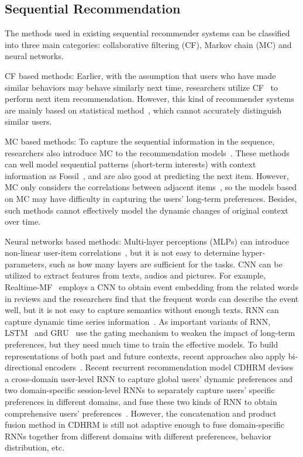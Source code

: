 \documentclass[preprint,12pt]{elsarticle}
\begin{document}
\begin{sloppypar}
\subsection{Sequential Recommendation}

The methods used in existing sequential recommender systems can be classified into three main categories: collaborative filtering (CF), Markov chain (MC) and neural networks.

CF based methods: Earlier, with the assumption that users who have made similar behaviors may behave similarly next time, researchers utilize CF~\cite{chen2020deep, qin2020sequential, he2016ups} to perform next item recommendation. However, this kind of recommender systems are mainly based on statistical method~\cite{ungar1998formal}, which cannot accurately distinguish similar users.

MC based methods: To capture the sequential information in the sequence, researchers also introduce MC to the recommendation models~\cite{rendle2010factorizing, he2016fusing}. These methods can well model sequential patterns (short-term interests) with context information as Fossil~\cite{he2016fusing}, and are also good at predicting the next item. However, MC only considers the correlations between adjacent items~\cite{rendle2010factorizing}, so the models based on MC may have difficulty in capturing the users' long-term preferences. Besides, such methods cannot effectively model the dynamic changes of original context over time. 

Neural networks based methods: Multi-layer perceptions (MLPs) can introduce non-linear user-item correlations~\cite{he2017neural}, but it is not easy to determine hyper-parameters, such as how many layers are sufficient for the tasks. CNN can be utilized to extract features from texts, audios and pictures\cite{he2016vbpr, van2013deep, hao2019real}. For example, Realtime-MF~\cite{hao2019real} employs a CNN to obtain event embedding from the related words in reviews and the researchers find that the frequent words can describe the event well, but it is not easy to capture semantics without enough texts. RNN can capture dynamic time series information~\cite{zhou2018personalized, wang2019cross, wu2017recurrent}. As important variants of RNN, LSTM~\cite{jozefowicz2015empirical} and GRU~\cite{luo2019adaptive} use the gating mechanism to weaken the impact of long-term preferences, but they need much time to train the effective models. To build representations of both past and future contexts, recent approaches also apply bi-directional encoders~\cite{bansal2016ask}. Recent recurrent recommendation model CDHRM devises a cross-domain user-level RNN to capture global users' dynamic preferences and two domain-specific session-level RNNs to separately capture users' specific preferences in different domains, and fuse these two kinds of RNN to obtain comprehensive users' preferences~\cite{wang2019cross}. However, the concatenation and product fusion method in CDHRM is still not adaptive enough to fuse domain-specific RNNs together from different domains with different preferences, behavior distribution, etc.


\end{sloppypar}
\end{document}
